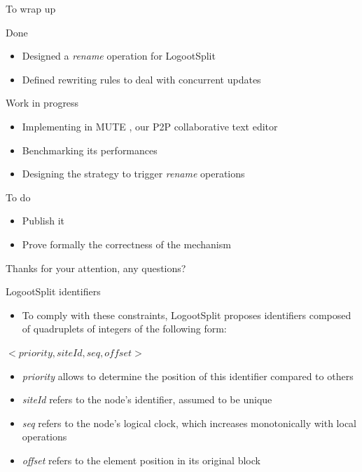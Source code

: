 \documentclass[10pt]{beamer}
\begin{document}
\begin{frame}{To wrap up}
  \begin{block}{Done}
    \begin{itemize}
      \item Designed a \emph{rename} operation for LogootSplit
      \item Defined rewriting rules to deal with concurrent updates
    \end{itemize}
  \end{block}

  \pause

  \begin{block}{Work in progress}
    \begin{itemize}
      \item Implementing in MUTE , our P2P collaborative text editor
      \item Benchmarking its performances
      \item Designing the strategy to trigger \emph{rename} operations
    \end{itemize}
  \end{block}

  \pause

  \begin{block}{To do}
    \begin{itemize}
      \item Publish it
      \item Prove formally the correctness of the mechanism
    \end{itemize}
  \end{block}
\end{frame}

\begin{frame}[standout]
  Thanks for your attention, any questions?
  \vspace{3em}
  \begin{center}
    \ccby
  \end{center}
\end{frame}

\begin{frame}{LogootSplit identifiers}
  \begin{itemize}
    \item To comply with these constraints, LogootSplit proposes identifiers composed of quadruplets of integers of the following form:
  \end{itemize}
  \begin{center}
    $<priority, siteId, seq, offset>$
  \end{center}
  \begin{itemize}
    \item \emph{priority} allows to determine the position of this identifier compared to others
    \item \emph{siteId} refers to the node's identifier, assumed to be unique
    \item \emph{seq} refers to the node's logical clock, which increases monotonically with local operations
    \item \emph{offset} refers to the element position in its original block
  \end{itemize}
\end{frame}
\end{document}

